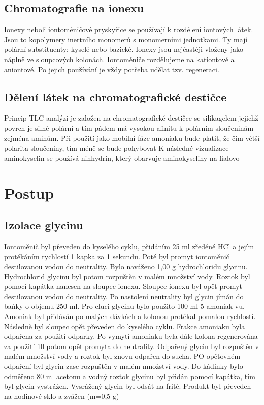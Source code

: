 \documentclass[13pt, a4paper, twoside]{article}
\begin{document}
    \subsection*{Chromatografie na ionexu}
    Ionexy neboli iontoměničové pryskyřice se používají k rozdělení iontových látek. Jsou to
    kopolymery inertního monomerů s monomerními jednotkami. Ty mají polární substituenty:
    kyselé nebo bazické. Ionexy jsou nejčastěji vloženy jako náplně ve sloupcových kolonách.
    Iontoměniče rozdělujeme na kationtové a aniontové. Po jejich používání je vždy potřeba
    udělat tzv. regeneraci.

    \subsection*{Dělení látek na chromatografické destičce}
    Princip TLC analýzi je založen na chromatografické destičce se silikagelem jejichž povrch je
    silně polární a tím pádem má vysokou afinitu k polárním sloučeninám zejména aminům. Při
    použití jako mobilní fáze amoniaku bude platit, že čím větší polarita sloučeniny, tím méně se
    bude pohybovat
    K následné vizualizace aminokyselin se používá ninhydrin, který obarvuje aminokyseliny na
    fialovo

    \section*{Postup}
    \subsection*{Izolace glycinu}
    Iontoměnič byl převeden do kyselého cyklu, přidáním 25 ml zředěné HCl a jejím protékáním
    rychlostí 1 kapka za 1 sekundu. Poté byl promyt iontoměnič destilovanou vodou do
    neutrality. Bylo naváženo 1,00 g hydrochloridu glycinu. Hydrochlorid glycinu byl potom
    rozpuštěn v malém množství vody. Roztok byl pomocí kapátka nanesen na sloupec ionexu.
    Sloupec ionexu byl opět promyt destilovanou vodou do neutrality. Po nastolení neutrality byl
    glycin jímán do baňky o objemu 250 ml. Pro eluci glycinu bylo použito 100 ml 5%
    amoniak vu. Amoniak byl přidáván po malých dávkách a kolonou protékal pomalou rychlostí.
    Následně byl sloupec opět převeden do kyselého cyklu. Frakce amoniaku byla odpařena za
    použití odparky. Po vymytí amoniaku byla dále kolona regenerována za použití 10%
    potom opět promyta do neutrality. Odpařený glycin byl rozpuštěn v malém množství vody a
    roztok byl znovu odpařen do sucha. PO opětovném odpaření byl glycin zase rozpuštěn v
    malém množství vody. Do kádinky bylo odměřeno 80 ml acetonu a vodný roztok glycinu byl
    přidán pomocí kapátka, tím byl glycin vystrážen. Vysrážený glycin byl odsát na fritě. Produkt
    byl převeden na hodinové sklo a zvážen (m=0,5 g)
\end{document}
